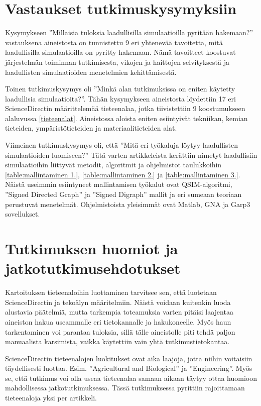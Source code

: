 \documentclass[utf8]{gradu3}
\begin{document}
\section{Vastaukset tutkimuskysymyksiin}
Kysymykseen 
''Millaisia tuloksia laadullisilla simulaatioilla pyritään hakemaan?''
vastauksena aineistosta on tunnistettu 9 eri yhtenevää tavoitetta, 
mitä laadullisilla simulaatioilla on pyritty hakemaan. Nämä tavoitteet
koostuvat järjestelmän toiminnan tutkimisesta, 
vikojen ja haittojen selvityksestä ja laadullisten simulaatioiden menetelmien kehittämisestä.

Toinen tutkimuskysymys oli
''Minkä alan tutkimuksissa on eniten käytetty laadullisia simulaatioita?''.
Tähän kysymykseen aineistosta löydettiin 17 eri ScienceDirectin määrittelemää
tieteenalaa, jotka tiivistettiin 9 koostumukseen alaluvussa \ref{tieteenalat}.
Aineistossa aloista eniten esiintyivät tekniikan, kemian tieteiden, ympäristötieteiden ja materiaalitieteiden alat.

Viimeinen tutkimuskysymys oli, että
''Mitä eri työkaluja löytyy laadullisten simulaatioiden luomiseen?''
Tätä varten artikkeleista kerättiin nimetyt laadullisiin simulaatioihin liittyvät
metodit, algoritmit ja ohjelmistot taulukkoihin \ref{table:mallintaminen 1.},
\ref{table:mallintaminen 2.} ja \ref{table:mallintaminen 3.}. 
Näistä useimmin esiintyneet mallintamisen työkalut
ovat QSIM-algoritmi, ''Signed Directed Graph'' ja ''Signed Digraph'' mallit
ja eri sumeaan teoriaan perustuvat menetelmät.
Ohjelmistoista yleisimmät ovat Matlab, GNA ja Garp3 sovellukset.

\section{Tutkimuksen huomiot ja jatkotutkimusehdotukset}
Kartoituksen tieteenaloihin luottaminen tarvitsee sen, 
että luotetaan ScienceDirectin  ja tekoälyn määritelmiin. 
Näistä voidaan kuitenkin luoda alustavia päätelmiä, mutta tarkempia
toteamuksia varten pitäisi laajentaa aineiston hakua useammalle eri tietokannalle ja hakukoneelle. Myös haun tarkentaminen voi parantaa tuloksia, sillä tälle 
aineistolle piti tehdä paljon manuaalista karsimista, 
vaikka käytettiin vain yhtä tutkimustietokantaa.

ScienceDirectin tieteenalojen luokitukset ovat aika laajoja, jotta niihin voitaisiin täydellisesti luottaa. Esim. ''Agricultural and Biological'' ja ''Engineering''. Myös se, että tutkimus voi olla useaa tieteenalaa samaan aikaan täytyy ottaa huomioon mahdollisessa jatkotutkimuksessa. 
Tässä tutkimuksessa pyrittiin rajoittamaan tieteenaloja yksi per artikkeli.
\end{document}
